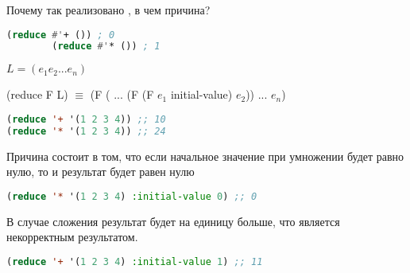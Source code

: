 \documentclass[a4paper,oneside,12pt]{extreport}
\begin{document}
\begin{task}
    Почему так реализовано , в чем причина? 

    \begin{lstlisting}[language=Lisp]
        (reduce #'+ ()) ; 0
        (reduce #'* ()) ; 1
    \end{lstlisting}
        
    $ L = (e_1 e_2 ... e_n )$

    (reduce F L) $\equiv$ (F ( ... (F (F $e_1$ initial-value) $e_2$)) ... $e_n$)

    \begin{lstlisting}[language=Lisp]
(reduce '+ '(1 2 3 4)) ;; 10
(reduce '* '(1 2 3 4)) ;; 24
    \end{lstlisting}

    Причина состоит в том, что если начальное значение при
    умножении будет равно нулю, то и результат будет равен нулю
    \begin{lstlisting}[language=Lisp]
(reduce '* '(1 2 3 4) :initial-value 0) ;; 0
    \end{lstlisting}

    В случае сложения результат будет на единицу больше, 
    что является некорректным результатом.
    \begin{lstlisting}[language=Lisp]
(reduce '+ '(1 2 3 4) :initial-value 1) ;; 11
    \end{lstlisting}
        

\end{task}
\end{document}
